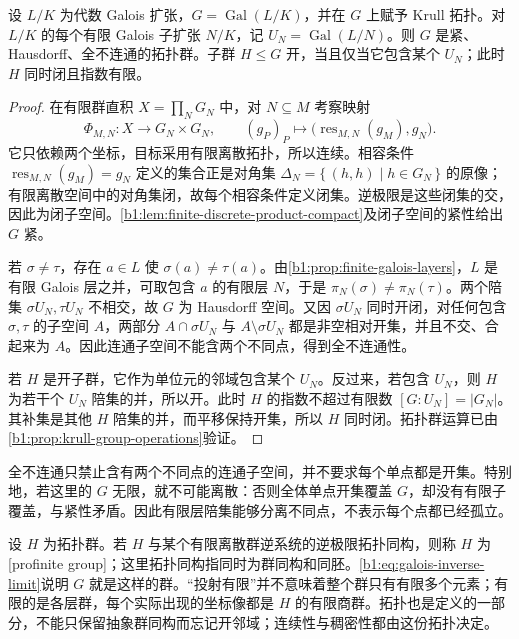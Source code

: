 \begin{theorem}\label{b1:thm:krull-compact}
	设 \(L/K\) 为代数 Galois 扩张，\(G=\operatorname{Gal}(L/K)\)，并在 \(G\) 上赋予 Krull 拓扑。对 \(L/K\) 的每个有限 Galois 子扩张 \(N/K\)，记 \(U_N=\operatorname{Gal}(L/N)\)。则 \(G\) 是紧、Hausdorff、全不连通的拓扑群。子群 \(H\leq G\) 开，当且仅当它包含某个 \(U_N\)；此时 \(H\) 同时闭且指数有限。
\end{theorem}
\begin{proof}
	在有限群直积 \(X=\prod_NG_N\) 中，对 \(N\subseteq M\) 考察映射
	\[
		\Phi_{M,N}:X\longrightarrow G_N\times G_N,\qquad (g_P)_P\longmapsto\bigl(\operatorname{res}_{M,N}(g_M),g_N\bigr).
	\]
	它只依赖两个坐标，目标采用有限离散拓扑，所以连续。相容条件 \(\operatorname{res}_{M,N}(g_M)=g_N\) 定义的集合正是对角集 \(\Delta_N=\{\,(h,h)\mid h\in G_N\,\}\) 的原像；有限离散空间中的对角集闭，故每个相容条件定义闭集。逆极限是这些闭集的交，因此为闭子空间。\cref{b1:lem:finite-discrete-product-compact}及闭子空间的紧性给出 \(G\) 紧。

	若 \(\sigma\ne\tau\)，存在 \(a\in L\) 使 \(\sigma(a)\ne\tau(a)\)。由\cref{b1:prop:finite-galois-layers}，\(L\) 是有限 Galois 层之并，可取包含 \(a\) 的有限层 \(N\)，于是 \(\pi_N(\sigma)\ne\pi_N(\tau)\)。两个陪集 \(\sigma U_N,\tau U_N\) 不相交，故 \(G\) 为 Hausdorff 空间。又因 \(\sigma U_N\) 同时开闭，对任何包含 \(\sigma,\tau\) 的子空间 \(A\)，两部分 \(A\cap\sigma U_N\) 与 \(A\setminus\sigma U_N\) 都是非空相对开集，并且不交、合起来为 \(A\)。因此连通子空间不能含两个不同点，得到全不连通性。

	若 \(H\) 是开子群，它作为单位元的邻域包含某个 \(U_N\)。反过来，若包含 \(U_N\)，则 \(H\) 为若干个 \(U_N\) 陪集的并，所以开。此时 \(H\) 的指数不超过有限数 \([G:U_N]=|G_N|\)。其补集是其他 \(H\) 陪集的并，而平移保持开集，所以 \(H\) 同时闭。拓扑群运算已由\cref{b1:prop:krull-group-operations}验证。
\end{proof}

全不连通只禁止含有两个不同点的连通子空间，并不要求每个单点都是开集。特别地，若这里的 \(G\) 无限，就不可能离散：否则全体单点开集覆盖 \(G\)，却没有有限子覆盖，与紧性矛盾。因此有限层陪集能够分离不同点，不表示每个点都已经孤立。

\ProseParagraphBreak
设 \(H\) 为拓扑群。若 \(H\) 与某个有限离散群逆系统的逆极限拓扑同构，则称 \(H\) 为[profinite group]；这里拓扑同构指同时为群同构和同胚。\eqref{b1:eq:galois-inverse-limit}说明 \(G\) 就是这样的群。“投射有限”并不意味着整个群只有有限多个元素；有限的是各层群，每个实际出现的坐标像都是 \(H\) 的有限商群。拓扑也是定义的一部分，不能只保留抽象群同构而忘记开邻域；连续性与稠密性都由这份拓扑决定。
